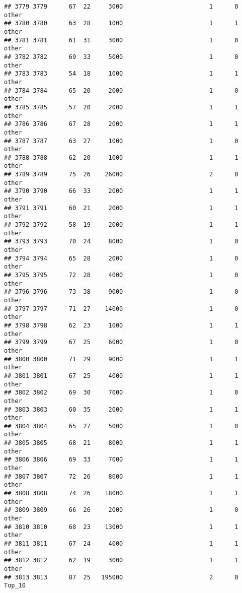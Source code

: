 \documentclass[
]{article}
\begin{document}
\begin{verbatim}
## 3779 3779      67  22     3000                        1      0    other
## 3780 3780      63  28     1000                        1      1    other
## 3781 3781      61  31     3000                        1      0    other
## 3782 3782      69  33     5000                        1      0    other
## 3783 3783      54  18     1000                        1      1    other
## 3784 3784      65  20     2000                        1      0    other
## 3785 3785      57  20     2000                        1      1    other
## 3786 3786      67  28     2000                        1      1    other
## 3787 3787      63  27     1000                        1      0    other
## 3788 3788      62  20     1000                        1      1    other
## 3789 3789      75  26    26000                        2      0    other
## 3790 3790      66  33     2000                        1      1    other
## 3791 3791      60  21     2000                        1      1    other
## 3792 3792      58  19     2000                        1      1    other
## 3793 3793      70  24     8000                        1      0    other
## 3794 3794      65  28     2000                        1      0    other
## 3795 3795      72  28     4000                        1      0    other
## 3796 3796      73  38     9000                        1      0    other
## 3797 3797      71  27    14000                        1      0    other
## 3798 3798      62  23     1000                        1      1    other
## 3799 3799      67  25     6000                        1      0    other
## 3800 3800      71  29     9000                        1      1    other
## 3801 3801      67  25     4000                        1      1    other
## 3802 3802      69  30     7000                        1      0    other
## 3803 3803      60  35     2000                        1      1    other
## 3804 3804      65  27     5000                        1      0    other
## 3805 3805      68  21     8000                        1      1    other
## 3806 3806      69  33     7000                        1      1    other
## 3807 3807      72  26     8000                        1      1    other
## 3808 3808      74  26    18000                        1      1    other
## 3809 3809      66  26     2000                        1      0    other
## 3810 3810      68  23    13000                        1      1    other
## 3811 3811      67  24     4000                        1      1    other
## 3812 3812      62  19     3000                        1      1    other
## 3813 3813      87  25   195000                        2      0   Top_10

\end{verbatim}
\end{document}
